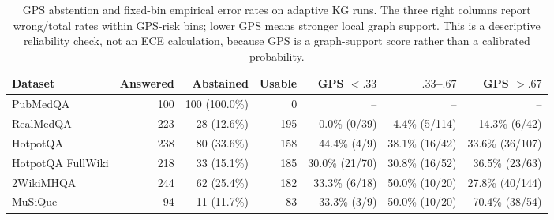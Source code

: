 \begin{table}[t]
\centering
\small
\caption{GPS abstention and fixed-bin empirical error rates on adaptive KG runs.  The three right columns report wrong/total rates within GPS-risk bins; lower GPS means stronger local graph support.  This is a descriptive reliability check, not an ECE calculation, because GPS is a graph-support score rather than a calibrated probability.}
\label{tab:gps_reliability_bins}
\setlength{\tabcolsep}{4pt}
\begin{tabular}{@{}lrrrrrr@{}}
\toprule
Dataset & Answered & Abstained & Usable & GPS $<.33$ & $.33$--$.67$ & GPS $>.67$ \\
\midrule
PubMedQA & 100 & 100 (100.0\%) & 0 & -- & -- & -- \\
RealMedQA & 223 & 28 (12.6\%) & 195 & 0.0\% (0/39) & 4.4\% (5/114) & 14.3\% (6/42) \\
HotpotQA & 238 & 80 (33.6\%) & 158 & 44.4\% (4/9) & 38.1\% (16/42) & 33.6\% (36/107) \\
HotpotQA FullWiki & 218 & 33 (15.1\%) & 185 & 30.0\% (21/70) & 30.8\% (16/52) & 36.5\% (23/63) \\
2WikiMHQA & 244 & 62 (25.4\%) & 182 & 33.3\% (6/18) & 50.0\% (10/20) & 27.8\% (40/144) \\
MuSiQue & 94 & 11 (11.7\%) & 83 & 33.3\% (3/9) & 50.0\% (10/20) & 70.4\% (38/54) \\
\bottomrule
\end{tabular}
\end{table}
